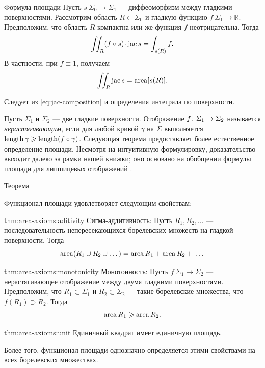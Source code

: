 \begin{thm}{Формула площади}\label{prop:surface-integral}
Пусть $s\:\Sigma_0\to \Sigma_1$ --- диффеоморфизм между гладкими поверхностями.
Рассмотрим область $R\subset \Sigma_0$ и гладкую функцию $f\:\Sigma_1\to\mathbb{R}$.
Предположим, что область $R$ компактна или же функция $f$ неотрицательна.
Тогда 
\[\iint_R (f\circ s)\cdot \jac s=\int_{s(R)}f.\]
В частности, при $f\equiv 1$, получаем
\[\iint_R \mathop{\rm jac}\nolimits s=\mathop{\rm area}\nolimits [s(R)].\]
\end{thm}

Следует из \ref{eq:jac-composition} и определения интеграла по поверхности.
\qeds


Пусть $\Sigma_1$ и $\Sigma_2$ --- две гладкие поверхности.
Отображение $f\:\Sigma_1\z\to \Sigma_2$ называется \emph{нерастягивающим}, если для любой кривой $\gamma$ на $\Sigma$ выполняется $\mathop{\rm length}\nolimits\gamma\geqslant \mathop{\rm length}\nolimits (f\circ\gamma)$. 
Следующая теорема предоставляет более естественное определение площади.
Несмотря на интуитивную формулировку, доказательство выходит далеко за рамки нашей книжки;
оно основано на обобщении формулы площади для липшицевых отображений \cite[3.2.3]{federer}.


\begin{thm}{Теорема}\label{thm:area-axioms}
{\sloppy
Функционал площади удовлетворяет следующим свойствам:

}

\begin{subthm}{thm:area-axioms:aditivity}
Сигма-аддитивность: 
Пусть $R_1,R_2,\dots$ --- последовательность непересекающихся борелевских множеств на гладкой поверхности.
Тогда 
\[\mathop{\rm area}\nolimits (R_1\cup R_2\cup \dots)=\mathop{\rm area}\nolimits R_1+\mathop{\rm area}\nolimits R_2+{}\dots\]
\end{subthm}

{\sloppy

\begin{subthm}{thm:area-axioms:monotonicity}
Монотонность:
Пусть $f\:\Sigma_1\to \Sigma_2$ --- нерастягивающее отображение между двумя гладкими поверхностями.
Предположим, что $R_1\subset \Sigma_1$ и $R_2\subset \Sigma_2$ --- такие борелевские множества, что $f(R_1)\supset R_2$.
Тогда 
\[\mathop{\rm area}\nolimits R_1\geqslant \mathop{\rm area}\nolimits R_2.\]
\end{subthm}

}

\begin{subthm}{thm:area-axioms:unit}
Единичный квадрат имеет единичную площадь. 
\end{subthm}

Более того, функционал площади однозначно определяется этими свойствами на всех борелевских множествах.
\end{thm}

